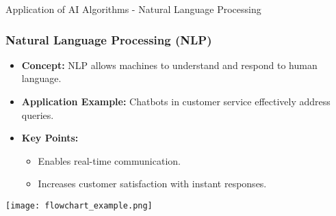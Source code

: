 \documentclass[aspectratio=169]{beamer}
\begin{document}
\begin{frame}[fragile]{Application of AI Algorithms - Natural Language Processing}
    \frametitle{Natural Language Processing (NLP)}
    \begin{itemize}
        \item \textbf{Concept:} NLP allows machines to understand and respond to human language.
        
        \item \textbf{Application Example:} Chatbots in customer service effectively address queries.
        
        \item \textbf{Key Points:}
        \begin{itemize}
            \item Enables real-time communication.
            \item Increases customer satisfaction with instant responses.
        \end{itemize}
    \end{itemize}
    \texttt{[image: flowchart\_example.png]} %
\end{frame}
\end{document}
